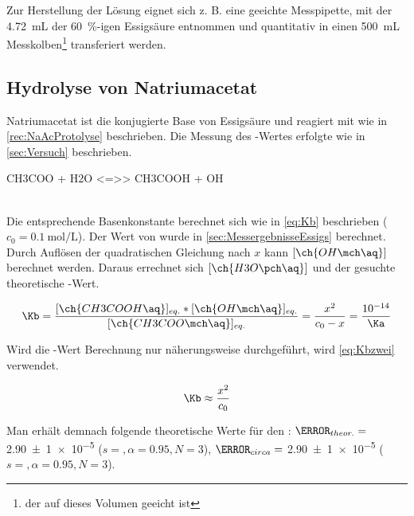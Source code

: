 \documentclass{article}
\begin{document}
         Zur Herstellung der Lösung eignet sich z. B. eine geeichte Messpipette, mit der \SI[mode=text]{4.72}{\milli\liter} der \SI[mode=text]{60}{\percent}-igen Essigsäure entnommen und quantitativ in einen \SI[mode=text]{500}{\milli\liter} Messkolben\footnote{der auf dieses Volumen geeicht ist} transferiert werden.
    
    \pagebreak
    
    \subsection{Hydrolyse von Natriumacetat} \label{sec:HydrolyseNatrium}
     
       Natriumacetat ist die konjugierte Base von Essigsäure und reagiert mit  wie in \ref{rec:NaAcProtolyse} beschrieben. Die Messung des \pH-Wertes erfolgte wie in \ref{sec:Versuch} beschrieben.
       
       \begin{reaction}
         CH3COO\mch\aq{} + H2O <=>> CH3COOH\aq{} + OH\mch\aq \label{rec:NaAcProtolyse} \\
       \end{reaction} \\
       
       Die entsprechende Basenkonstante \Kb berechnet sich wie in \ref{eq:Kb} beschrieben ($c_{0} = \SI[mode=text]{0.1}{\mole\per\liter}$). Der Wert von \Ka wurde in \ref{sec:MessergebnisseEssigs} berechnet. Durch Auflösen der quadratischen Gleichung nach $x$ kann $[\ch{OH\mch\aq}]$ berechnet werden. Daraus errechnet sich $[\ch{H3O\pch\aq}]$ und der gesuchte theoretische \pH-Wert. 
       
       \begin{equation}
         \Kb = \frac{[\ch{CH3COOH\aq}]_{eq.} * [\ch{OH\mch\aq}]_{eq.}}{[\ch{CH3COO\mch\aq}]_{eq.}} = \frac{x^2}{c_{0}-x} = \frac{\num{e-14}}{\Ka} \label{eq:Kb}
       \end{equation}
       
       Wird die \pH-Wert Berechnung nur näherungsweise durchgeführt, wird \ref{eq:Kbzwei} verwendet.
       
       \begin{equation}
         \Kb \approx \frac{x^2}{c_{0}} \label{eq:Kbzwei}
       \end{equation}
       
       Man erhält demnach folgende theoretische Werte für den \pH: $\pH_{theor.} = $ \num[separate-uncertainty]{2.90 \pm 1 e-5} ($s = ,\alpha = 0.95, N = 3$), $\pH_{circa} = $ \num[separate-uncertainty]{2.90 \pm 1 e-5} ($s = ,\alpha = 0.95, N = 3$). \\
       
\end{document}
